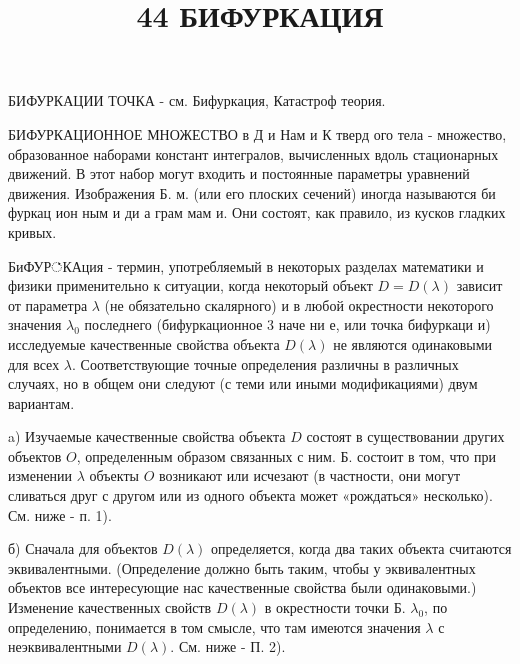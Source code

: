 \documentclass[10pt]{article}
\title{44 БИФУРКАЦИЯ }
\author{}
\date{}
\begin{document}
\maketitle

БИФУРКАЦИИ ТОЧКА - см. Бифуркация, Катастроф теория.



БИФУРКАЦИОННОЕ МНОЖЕСТВО в Д и Нам и К тверд ого тела - множество, образованное наборами констант интегралов, вычисленных вдоль стационарных движений. В этот набор могут входить и постоянные параметры уравнений движения. Изображения Б. м. (или его плоских сечений) иногда называются би фуркац ион ным и ди а грам мам и. Они состоят, как правило, из кусков гладких кривых.



БиФУР்КАция - термин, употребляемый в некоторых разделах математики и физики применительно к ситуации, когда некоторый объект $D=D(\lambda)$ зависит от параметра $\lambda$ (не обязательно скалярного) и в любой окрестности некоторого значения $\lambda_{0}$ последнего (бифуркационное 3 наче ни е, или точка бифуркаци и) исследуемые качественные свойства объекта $D(\lambda)$ не являются одинаковыми для всех $\lambda$. Соответствующие точные определения различны в различных случаях, но в общем они следуют (с теми или иными модификациями) двум вариантам.



a) Изучаемые качественные свойства объекта $D$ состоят в существовании других объектов $O$, определенным образом связанных с ним. Б. состоит в том, что при изменении $\lambda$ объекты $O$ возникают или исчезают (в частности, они могут сливаться друг с другом или из одного объекта может «рождаться» несколько). См. ниже - п. 1).



б) Сначала для объектов $D(\lambda)$ определяется, когда два таких объекта считаются эквивалентными. (Определение должно быть таким, чтобы у эквивалентных объектов все интересующие нас качественные свойства были одинаковыми.) Изменение качественных свойств $D(\lambda)$ в окрестности точки Б. $\lambda_{0}$, по определению, понимается в том смысле, что там имеются значения $\lambda$ с неэквивалентными $D(\lambda)$. См. ниже - П. 2).
\end{document}
